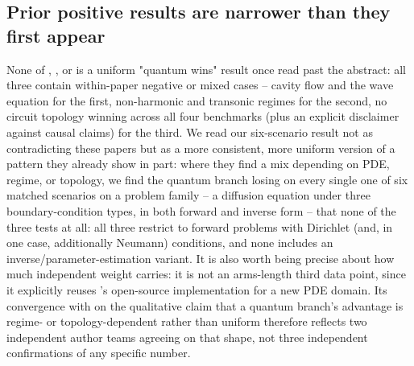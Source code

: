 
\subsection{Prior positive results are narrower than they first appear}
None of \citet{farea2025qcpinn}, \citet{hqpinn2025flow}, or
\citet{qcpinn2025reservoir} is a uniform "quantum wins" result once read
past the abstract: all three contain within-paper negative or mixed cases
-- cavity flow and the wave equation for the first, non-harmonic and
transonic regimes for the second, no circuit topology winning across all
four benchmarks (plus an explicit disclaimer against causal claims) for
the third. We read our six-scenario result not as contradicting these
papers but as a more consistent, more uniform version of a pattern they
already show in part: where they find a mix depending on PDE, regime, or
topology, we find the quantum branch losing on every single one of six
matched scenarios on a problem family -- a diffusion equation under three
boundary-condition types, in both forward and inverse form -- that none of
the three tests at all: all three restrict to forward problems with
Dirichlet (and, in one case, additionally Neumann) conditions, and none
includes an inverse/parameter-estimation variant. It is also worth being
precise about how much independent weight \citet{qcpinn2025reservoir}
carries: it is not an arms-length third data point, since it explicitly
reuses \citeauthor{farea2025qcpinn}'s open-source implementation for a new
PDE domain. Its convergence with \citet{hqpinn2025flow} on the qualitative
claim that a quantum branch's advantage is regime- or topology-dependent
rather than uniform therefore reflects two independent author teams
agreeing on that shape, not three independent confirmations of any
specific number.

